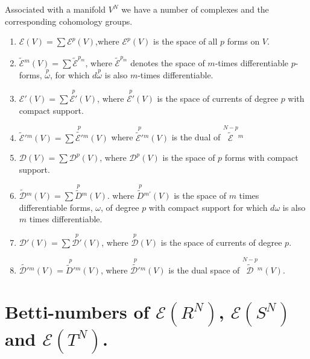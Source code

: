 Associated with a manifold $V^{N}$ we have a number of complexes and
the corresponding cohomology groups.
\begin{enumerate}
\renewcommand{\theenumi}{\roman{enumi}}
\renewcommand{\labelenumi}{\theenumi)}
\item $\mathscr{E}(V)=\sum\mathscr{E}^{p}(V)$,\pageoriginale where
  $\mathscr{E}^{p}(V)$ is the space of all $p$ forms on $V$.

\item $\widetilde{\mathscr{E}}{}^{m}(V)=\sum
  \widetilde{\mathscr{E}}^{p_{m}}$, where
  $\widetilde{\mathscr{E}}^{p_{m}}$ denotes the space of $m$-times
  differentiable $p$-forms, $\overset{p}{\omega}$, for which
  $d\overset{p}{\omega}$ is also $m$-times differentiable.

\item $\mathscr{E}'(V)=\sum\overset{p}{\mathscr{E}'}(V)$, where
  $\overset{p}{\mathscr{E}'}(V)$ is the space of currents of degree
  $p$ with compact support.

\item
  $\widetilde{\mathscr{E}}'{}^{m}(V)=\sum\overset{p}{\widetilde{\mathscr{E}'}}{}^{m}(V)$
  where $\overset{p}{\widetilde{\mathscr{E}}'}{}^{m}(V)$ is the dual of
  $\overset{N-p}{\widetilde{\mathscr{E}}}{}^{m}$ 

\item $\mathscr{D}(V)=\sum \mathscr{D}^{p}(V)$, where
  $\mathscr{D}^{p}(V)$ is the space of $p$ forms with compact support.

\item
  $\widetilde{\mathscr{D}}{}^{m}(V)=\sum\overset{p}{\widetilde{D}}{}^{m}(V)$.
  where $\overset{p}{\widetilde{D}}{}^{m'}(V)$ is the space of $m$ times
  differentiable forms, $\omega$, of degree $p$ with compact support
  for which $d\omega$ is also $m$ times differentiable.

\item $\mathscr{D}'(V)=\sum \overset{p}{\mathscr{D}'}(V)$, where
  $\overset{p}{\mathscr{D}}(V)$ is the space of currents of degree
  $p$.

\item
  $\widetilde{\mathscr{D}'}{}^{m}(V)=\overset{p}{\widetilde{D}'}{}^{m}(V)$,
  where $\overset{p}{\widetilde{\mathscr{D}'}}{}^{m}(V)$ is the dual
  space of $\overset{N-p}{\widetilde{\mathscr{D}}}{}^{m}(V)$.
\end{enumerate}

\section*{Betti-numbers of $\mathscr{E}(R^{N})$, $\mathscr{E}(S^{N})$
  and $\mathscr{E}(T^{N})$.}

